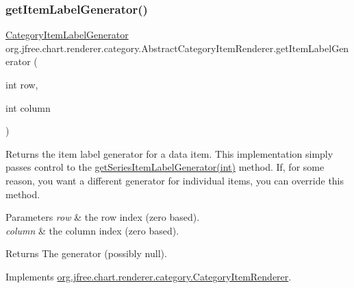 \subsubsection{\texorpdfstring{get\+Item\+Label\+Generator()}{getItemLabelGenerator()}}
{\footnotesize\ttfamily \mbox{\hyperlink{interfaceorg_1_1jfree_1_1chart_1_1labels_1_1_category_item_label_generator}{Category\+Item\+Label\+Generator}} org.\+jfree.\+chart.\+renderer.\+category.\+Abstract\+Category\+Item\+Renderer.\+get\+Item\+Label\+Generator (\begin{DoxyParamCaption}\item[{int}]{row,  }\item[{int}]{column }\end{DoxyParamCaption})}

Returns the item label generator for a data item. This implementation simply passes control to the \mbox{\hyperlink{classorg_1_1jfree_1_1chart_1_1renderer_1_1category_1_1_abstract_category_item_renderer_a2ec1e67d9952e7d8d39ba4a9f59184f7}{get\+Series\+Item\+Label\+Generator(int)}} method. If, for some reason, you want a different generator for individual items, you can override this method.


\begin{DoxyParams}{Parameters}
{\em row} & the row index (zero based). \\
\hline
{\em column} & the column index (zero based).\\
\hline
\end{DoxyParams}
\begin{DoxyReturn}{Returns}
The generator (possibly {\ttfamily null}). 
\end{DoxyReturn}


Implements \mbox{\hyperlink{interfaceorg_1_1jfree_1_1chart_1_1renderer_1_1category_1_1_category_item_renderer_a04320f200d3febfed424b954266b114c}{org.\+jfree.\+chart.\+renderer.\+category.\+Category\+Item\+Renderer}}.

\mbox{\label{classorg_1_1jfree_1_1chart_1_1renderer_1_1category_1_1_abstract_category_item_renderer_ac7735a16d0efdbaaf7e7542a455e763b}} 
